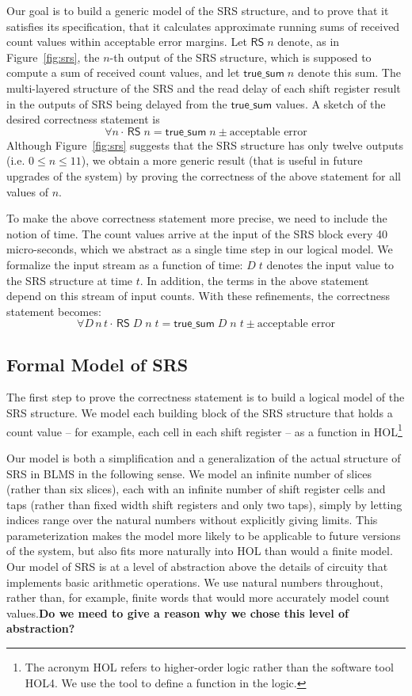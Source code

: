 \documentclass{llncs}
\begin{document}
Our goal is to build a generic model of the SRS structure, and to prove that it satisfies its specification, that it calculates approximate running sums of received count values within acceptable error margins.
Let $\mathsf{RS}\;n$ denote, as in Figure~\ref{fig:srs}, the $n$-th output of the SRS structure, which is supposed to compute a sum of received count values, and let $\mathsf{true\_sum}\;n$ denote this sum.
The multi-layered structure of the SRS and the read delay of each shift register result in the outputs of SRS being delayed from the $\mathsf{true\_sum}$ values.
A sketch of the desired correctness statement is \[\forall{n} \cdot \, \mathsf{RS}\;n= \mathsf{true\_sum}\; n \pm\text{acceptable error}\]
Although Figure~\ref{fig:srs} suggests that the SRS structure has only twelve outputs  (i.e. $0\leq{n}\leq11$), we obtain a more generic result (that is useful in future upgrades of the system) by proving the correctness of the above statement for all values of $n$.

To make the above correctness statement more precise, we need to include the notion of time.
The count values arrive at the input of the SRS block every 40 micro-seconds, which we abstract as a single time step in our logical model.
We formalize the input stream as a function of time: $D\;t$ denotes the input value to the SRS structure at time $t$.
In addition, the terms in the above statement depend on this stream of input counts.
With these refinements, the correctness statement becomes: \[\forall{D\,n\,t} \cdot \,\mathsf{RS}\;D\;n\;t = \mathsf{true\_sum}\;D\;n\;t\pm\text{acceptable error}\]

\subsection{Formal Model of SRS}
The first step to prove the correctness statement is to build a logical model of the SRS structure.
We model each building block of the SRS structure that holds a count value -- for example, each cell in each shift register -- as a function in HOL\footnote{The acronym HOL refers to higher-order logic rather than the software tool HOL4.
We use the tool to define a function in the logic.}

Our model is both a simplification and a generalization of the actual structure of SRS in BLMS in the following sense.
We model an infinite number of slices (rather than six slices), each with an infinite number of shift register cells and taps (rather than fixed width shift registers and only two taps), simply by letting indices range over the natural numbers without explicitly giving limits.
This parameterization makes the model more likely to be applicable to future versions of the system, but also fits more naturally into HOL than would a finite model.
Our model of SRS is at a level of abstraction above the details of circuity that implements basic arithmetic operations.
We use natural numbers throughout, rather than, for example, finite words that would more accurately model count values.{\bf Do we meed to give a reason why we chose this level of abstraction?}
\end{document}
